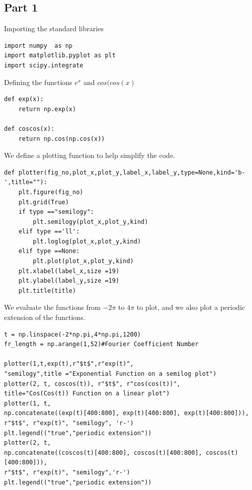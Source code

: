 \documentclass[11pt, a4paper]{article}
\begin{document}
\subsection{Part 1}
Importing the standard libraries
\begin{verbatim}
import numpy  as np
import matplotlib.pyplot as plt
import scipy.integrate
\end{verbatim}
Defining the functions $e^{x}$ and $cos(cos(x)$
\begin{verbatim}
def exp(x):
    return np.exp(x)

def coscos(x):
    return np.cos(np.cos(x))
\end{verbatim}
We define a plotting function to help simplify the code.
\begin{verbatim}
def plotter(fig_no,plot_x,plot_y,label_x,label_y,type=None,kind='b-',title=""):
    plt.figure(fig_no)
    plt.grid(True)
    if type =="semilogy":
        plt.semilogy(plot_x,plot_y,kind)
    elif type =='ll':
        plt.loglog(plot_x,plot_y,kind)
    elif type ==None:
        plt.plot(plot_x,plot_y,kind)
    plt.xlabel(label_x,size =19)
    plt.ylabel(label_y,size =19)
    plt.title(title)
\end{verbatim}
We evaluate the functions from $-2\pi$ to $4\pi$ to plot, and we also plot a periodic extension of the functions.
\begin{verbatim}
t = np.linspace(-2*np.pi,4*np.pi,1200)
fr_length = np.arange(1,52)#Fourier Coefficient Number

plotter(1,t,exp(t),r"$t$",r"exp(t)",
"semilogy",title ="Exponential Function on a semilog plot")
plotter(2, t, coscos(t)), r"$t$", r"cos(cos(t))",
title="Cos(Cos(t)) Function on a linear plot")
plotter(1, t,
np.concatenate((exp(t)[400:800], exp(t)[400:800], exp(t)[400:800])),
r"$t$", r"exp(t)", "semilogy", 'r-')
plt.legend(("true","periodic extension"))
plotter(2, t,
np.concatenate((coscos(t)[400:800], coscos(t)[400:800], coscos(t)[400:800])),
r"$t$", r"exp(t)", "semilogy",'r-')
plt.legend(("true","periodic extension"))
\end{verbatim}
\end{document}
